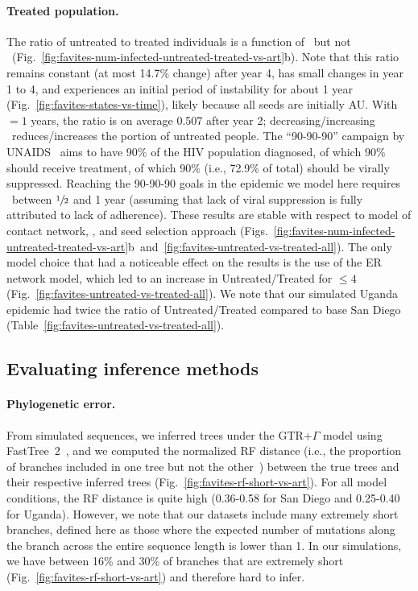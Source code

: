 \paragraph{Treated population.} The ratio of untreated to treated individuals is a function of \EART\ but not \ED\ (Fig.~\ref{fig:favites-num-infected-untreated-treated-vs-art}b). Note that this ratio remains constant (at most 14.7\% change) after year 4, has small changes in year 1 to 4, and experiences an initial period of instability for about 1 year (Fig.~\ref{fig:favites-states-vs-time}), likely because all seeds are initially AU. With \EART$=1$ years, the ratio is on average 0.507 after year 2; decreasing/increasing \EART\ reduces/increases the portion of untreated people. The ``90-90-90'' campaign by \gls{UNAIDS}~\cite{UNAIDS2017} aims to have 90\% of the \gls{HIV} population diagnosed, of which 90\% should receive treatment, of which  90\% (i.e., 72.9\% of total) should be virally suppressed. Reaching the 90-90-90 goals in the epidemic we model here requires \EART\ between $\sfrac{1}{2}$ and 1 year (assuming that lack of viral suppression is fully attributed to lack of adherence). These results are stable with respect to model of contact network, \ED, and seed selection approach (Figs.~\ref{fig:favites-num-infected-untreated-treated-vs-art}b~and~\ref{fig:favites-untreated-vs-treated-all}). The only model choice that had a noticeable effect on the results is the use of the \gls{ER} network model, which led to an increase in Untreated/Treated for \ED$\leq 4$ (Fig.~\ref{fig:favites-untreated-vs-treated-all}). We note that our simulated Uganda epidemic had twice the ratio of Untreated/Treated compared to base San Diego (Table~\ref{fig:favites-untreated-vs-treated-all}).

\subsection{Evaluating inference methods}\label{sec:trans_net_recon}
\paragraph{Phylogenetic error.} From simulated sequences, we inferred trees under the \gls{GTR}+$\Gamma$ model using FastTree~2~\cite{Price2010}, and we computed the normalized \gls{RF} distance (i.e., the proportion of branches included in one tree but not the other~\cite{Robinson1981}) between the true trees and their respective inferred trees (Fig.~\ref{fig:favites-rf-short-vs-art}). For all model conditions, the \gls{RF} distance is quite high (0.36-0.58 for San Diego and 0.25-0.40 for Uganda). However, we note that our datasets include many extremely short branches, defined here as those where the expected number of mutations along the branch across the entire sequence length is lower than 1. In our simulations, we have between 16\% and 30\% of branches that are extremely short (Fig.~\ref{fig:favites-rf-short-vs-art}) and therefore hard to infer.

